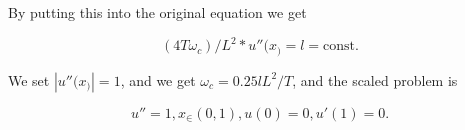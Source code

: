 \documentclass[10pt, a4paper]{amsart}
\numberwithin{figure}{section}
\numberwithin{table}{section}
\begin{document}
By putting this into the original equation we get

\begin{equation}
    (4T \omega_c)/L^2 * u''(x_) = l = \text{const}. 
\end{equation}

We set $|u''(x_)|= 1$, and we get $\omega_c = 0.25lL^2/T$, and the scaled problem is

    \begin{equation}
        u'' = 1, x_ \in (0,1), u(0) = 0, u'(1) = 0.
    \end{equation}


\end{document}
